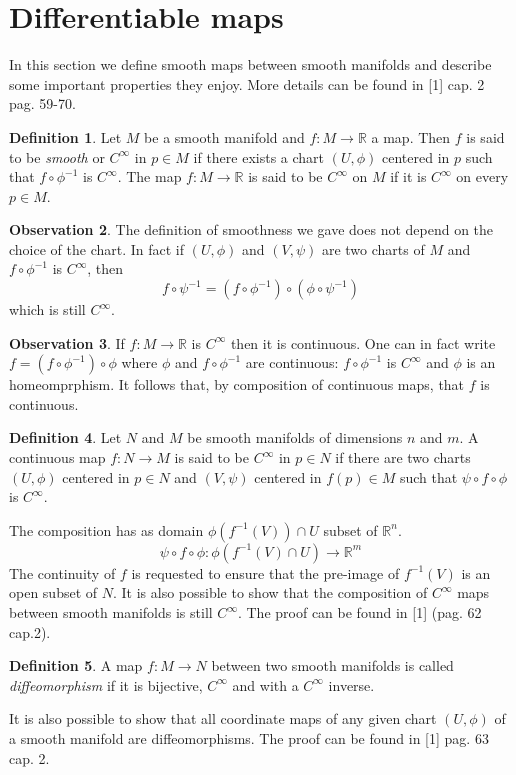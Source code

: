 \documentclass[12pt,a4paper]{report}
\theoremstyle{definition}
\newtheorem{Def}{Definition}[chapter]
\theoremstyle{Theorem}
\theoremstyle{definition}
\theoremstyle{definition}
\newtheorem{Obs}[Def]{Observation}
\begin{document}
	\section{Differentiable maps}
	In this section we define smooth maps between smooth manifolds and describe some important properties they enjoy. More details can be found in [1] cap. 2 pag. 59-70.
	\begin{Def}
		Let $M$ be a smooth manifold and $f:M\rightarrow\mathbb{R}$ a map. Then $f$ is said to be \textit{smooth} or $C^\infty$ in $p\in M$ if there exists a chart $(U,\phi)$ centered in $p$ such that $f\circ \phi^{-1}$ is $C^\infty$. The map $f:M\rightarrow \mathbb{R}$ is said to be $C^\infty$ on $M$ if it is $C^\infty$ on every $p\in M$.
	\end{Def}
	\begin{Obs}
		The definition of smoothness we gave does not depend on the choice of the chart. In fact if $(U,\phi)$ and $(V,\psi)$ are two charts of $M$ and $f\circ\phi^{-1}$ is $C^\infty$, then $$f\circ\psi^{-1}=(f\circ\phi^{-1})\circ(\phi\circ\psi^{-1})$$ which is still $C^\infty$.
	\end{Obs}
	\begin{Obs}
		If $f:M\rightarrow \mathbb{R}$ is $C^\infty$ then it is continuous. One can in fact write $f=(f\circ\phi^{-1})\circ \phi$ where $\phi$ and $f\circ\phi^{-1}$ are continuous: $f\circ\phi^{-1}$ is $C^\infty$ and $\phi$ is an homeomprphism. It follows that, by composition of continuous maps, that $f$ is continuous.\\
	\end{Obs}
	\begin{Def}
		Let $N$ and $M$ be smooth manifolds of dimensions $n$ and $m$. A continuous map $f:N\rightarrow M$ is said to be $C^\infty$ in $p\in N$ if there are two charts $(U,\phi)$ centered in $p\in N$ and $(V,\psi)$ centered in $f(p)\in M$ such that $\psi\circ f\circ \phi$ is $C^\infty$.
	\end{Def}
	The composition has as domain $\phi(f^{-1}(V))\cap U$ subset of $\mathbb{R}^n$. $$\psi\circ f\circ \phi:\phi(f^{-1}(V)\cap U)\rightarrow \mathbb{R}^m$$
	The continuity of $f$ is requested to ensure that the pre-image of $f^{-1}(V)$ is an open subset of $N$. It is also possible to show that the composition of $C^\infty$ maps between smooth manifolds is still $C^\infty$. The proof can be found in [1] (pag. 62 cap.2). 
	\begin{Def}
		A map $f:M\rightarrow N$ between two smooth manifolds is called \textit{diffeomorphism} if it is bijective, $C^\infty$ and with a $C^\infty$ inverse.
	\end{Def}
	It is also possible to show that all coordinate maps of any given chart $(U,\phi)$ of a smooth manifold are diffeomorphisms. The proof can be found in [1] pag. 63 cap. 2.
\end{document}
